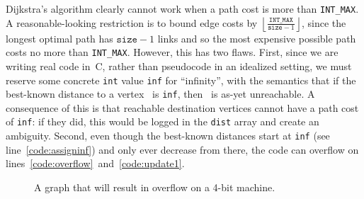 Dijkstra's algorithm clearly cannot work when a path
cost is more than \texttt{INT\_MAX}.  A reasonable-looking restriction
is to bound edge costs by
$\left\lfloor\frac{\texttt{INT\_MAX}}{\texttt{size}-1}\right\rfloor$, since
the longest optimal path has $\texttt{size}-1$ links and so the
most expensive possible path costs no more than \texttt{INT\_MAX}.
However, this has two flaws.  First, since we are writing real code in~C,
rather than pseudocode in an idealized setting, we must reserve some
concrete \texttt{int} value \texttt{inf} for ``infinity'', with
the semantics that if the best-known distance to a vertex~
is \texttt{inf}, then~ is as-yet unreachable.
A consequence of this is that reachable destination vertices cannot have a
path cost of \texttt{inf}: if they did, this would be logged in the
\texttt{dist} array and create an ambiguity.
Second, even though the best-known distances start at \texttt{inf}
(see line~\ref{code:assigninf}) and only ever decrease from there, the code can
overflow on lines~\ref{code:overflow}~and~\ref{code:update1}.

\begin{figure}[t]
\centering
{}
\vspace*{-1.25em}
\caption{A graph that will result in overflow on a 4-bit machine.}
\label{fig:overflow}
\vspace*{-1.75em}
\end{figure}

